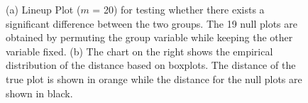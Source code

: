 \documentclass[12]{article}
\begin{document}
\begin{figure}[hbtp]
\centering
{}
\label{plottype}
	\vspace{-.1in}
\caption[Optional caption for list of figures]{(a) Lineup Plot ($m$ = 20) for testing whether there exists a significant difference between the two groups. The 19 null plots are obtained by permuting the group variable while keeping the other variable fixed.  (b) The chart on the right shows the empirical distribution of the distance based on boxplots. The distance of the true plot is shown in orange while the distance for the null plots are shown in black. }
\end{figure}
\end{document}
